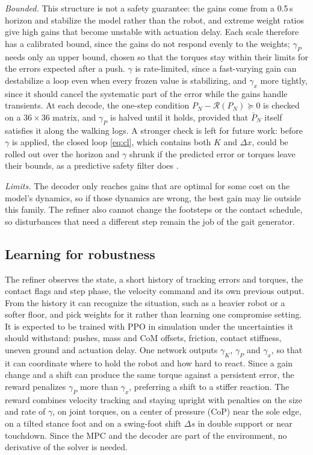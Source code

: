 \documentclass[conference]{IEEEtran}
\begin{document}
\emph{Bounded.} This structure is not a safety guarantee: the gains come from a 0.5\,s horizon and stabilize the model rather than the robot, and extreme weight ratios give high gains that become unstable with actuation delay.
Each scale therefore has a calibrated bound, since the gains do not respond evenly to the weights; $\gamma_P$ needs only an upper bound, chosen so that the torques stay within their limits for the errors expected after a push.
$\gamma$ is rate-limited, since a fast-varying gain can destabilize a loop even when every frozen value is stabilizing, and $\gamma_x$ more tightly, since it should cancel the systematic part of the error while the gains handle transients.
At each decode, the one-step condition $P_N-\mathcal R(P_N)\succeq0$ is checked on a $36\times36$ matrix, and $\gamma_P$ is halved until it holds, provided that $\bar P_N$ itself satisfies it along the walking logs.
A stronger check is left for future work: before $\gamma$ is applied, the closed loop \eqref{eq:cl}, which contains both $K$ and $\Delta x$, could be rolled out over the horizon and $\gamma$ shrunk if the predicted error or torques leave their bounds, as a predictive safety filter does \cite{wabersich2021psf,ames2019cbf,brunke2022safe}.

\emph{Limits.} The decoder only reaches gains that are optimal for some cost on the model's dynamics, so if those dynamics are wrong, the best gain may lie outside this family.
The refiner also cannot change the footsteps or the contact schedule, so disturbances that need a different step remain the job of the gait generator.

\subsection{Learning for robustness}
The refiner observes the state, a short history of tracking errors and torques, the contact flags and step phase, the velocity command and its own previous output.
From the history it can recognize the situation, such as a heavier robot or a softer floor, and pick weights for it rather than learning one compromise setting.
It is expected to be trained with PPO \cite{schulman2017ppo} in simulation under the uncertainties it should withstand: pushes, mass and CoM offsets, friction, contact stiffness, uneven ground and actuation delay.
One network outputs $\gamma_K$, $\gamma_P$ and $\gamma_x$, so that it can coordinate where to hold the robot and how hard to react.
Since a gain change and a shift can produce the same torque against a persistent error, the reward penalizes $\gamma_P$ more than $\gamma_x$, preferring a shift to a stiffer reaction.
The reward combines velocity tracking and staying upright with penalties on the size and rate of $\gamma$, on joint torques, on a center of pressure (CoP) near the sole edge, on a tilted stance foot and on a swing-foot shift $\Delta s$ in double support or near touchdown.
Since the MPC and the decoder are part of the environment, no derivative of the solver is needed.
\end{document}
